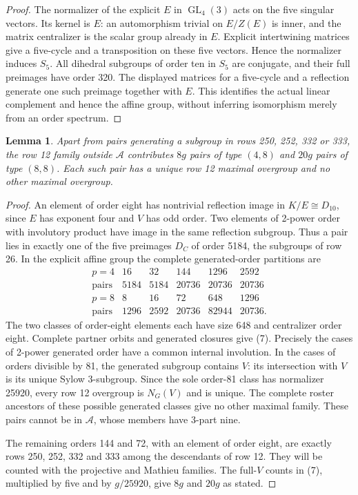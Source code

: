 \documentclass[11pt,a4paper]{article}
\newtheorem{lemma}{Lemma}\newtheorem{theorem}{Theorem}
\begin{document}
\begin{proof}
The normalizer of the explicit $E$ in $\operatorname{GL}_4(3)$
acts on the five singular vectors. Its kernel is $E$: an automorphism
trivial on $E/Z(E)$ is inner, and the matrix centralizer is the
scalar group already in $E$. Explicit intertwining matrices give
a five-cycle and a transposition on these five vectors. Hence the
normalizer induces $S_5$. All dihedral subgroups of order ten in
$S_5$ are conjugate, and their full preimages have order 320.
The displayed matrices for a five-cycle and a reflection generate
one such preimage together with $E$. This identifies the actual
linear complement and hence the affine group, without inferring
isomorphism merely from an order spectrum.
\end{proof}

\begin{lemma}\label{Ccount}
Apart from pairs generating a subgroup in rows 250, 252, 332 or 333,
the row 12 family outside $\mathcal A$ contributes $8g$ pairs of
type $(4,8)$ and $20g$ pairs of type $(8,8)$. Each such pair has a
unique row 12 maximal overgroup and no other maximal overgroup.
\end{lemma}
\begin{proof}
An element of order eight has nontrivial reflection image in
$K/E\cong D_{10}$, since $E$ has exponent four and $V$ has odd
order. Two elements of 2-power order with involutory product have
image in the same reflection subgroup. Thus a pair lies in exactly
one of the five preimages $D_C$ of order 5184, the subgroups of row 26.
In the explicit affine group the complete generated-order partitions
are
\[
\begin{array}{c|rrrrr}
p=4&16&32&144&1296&2592\\
\text{pairs}&5184&5184&20736&20736&20736\\\hline
p=8&8&16&72&648&1296\\
\text{pairs}&1296&2592&20736&82944&20736.
\end{array}                                                \tag{7}
\]
The two classes of order-eight elements each have size 648 and
centralizer order eight. Complete partner orbits and generated
closures give (7). Precisely the cases of 2-power generated order
have a common internal involution. In the cases of orders divisible
by 81, the generated subgroup contains $V$: its intersection with
$V$ is its unique Sylow 3-subgroup. Since the sole order-81 class
has normalizer 25920, every row 12 overgroup is $N_G(V)$ and is
unique. The complete roster ancestors of these possible generated
classes give no other maximal family. These pairs cannot be in
$\mathcal A$, whose members have 3-part nine.

The remaining orders 144 and 72, with an element of order eight,
are exactly rows 250, 252, 332 and 333 among the descendants of row 12.
They will be counted with the projective and Mathieu families.
The full-$V$ counts in (7), multiplied by five and by $g/25920$,
give $8g$ and $20g$ as stated.
\end{proof}
\end{document}
